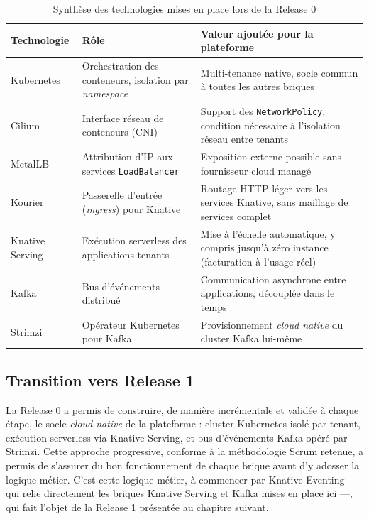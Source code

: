 \begin{table}[!ht]
\begin{center}
     \begin{tabular}{|l{2.8cm}|l{4.8cm}|l{5.4cm}|}
     \hline
     \textbf{Technologie} & \textbf{Rôle} & \textbf{Valeur ajoutée pour la plateforme} \\
     \hline
     Kubernetes & Orchestration des conteneurs, isolation par \textit{namespace} & Multi-tenance native, socle commun à toutes les autres briques \\
     \hline
     Cilium & Interface réseau de conteneurs (CNI) & Support des \texttt{NetworkPolicy}, condition nécessaire à l'isolation réseau entre tenants \\
     \hline
     MetalLB & Attribution d'IP aux services \texttt{LoadBalancer} & Exposition externe possible sans fournisseur cloud managé \\
     \hline
     Kourier & Passerelle d'entrée (\textit{ingress}) pour Knative & Routage HTTP léger vers les services Knative, sans maillage de services complet \\
     \hline
     Knative Serving & Exécution serverless des applications tenants & Mise à l'échelle automatique, y compris jusqu'à zéro instance (facturation à l'usage réel) \\
     \hline
     Kafka & Bus d'événements distribué & Communication asynchrone entre applications, découplée dans le temps \\
     \hline
     Strimzi & Opérateur Kubernetes pour Kafka & Provisionnement \textit{cloud native} du cluster Kafka lui-même \\
     \hline
     \end{tabular}
     \caption{Synthèse des technologies mises en place lors de la Release 0}
     \label{tab:synthese-release0}
     \end{center}
\end{table}

\subsection{Transition vers Release 1}

La Release 0 a permis de construire, de manière incrémentale et validée à chaque étape, le socle \textit{cloud native} de la plateforme : cluster Kubernetes isolé par tenant, exécution serverless via Knative Serving, et bus d'événements Kafka opéré par Strimzi. Cette approche progressive, conforme à la méthodologie Scrum retenue, a permis de s'assurer du bon fonctionnement de chaque brique avant d'y adosser la logique métier. C'est cette logique métier, à commencer par Knative Eventing — qui relie directement les briques Knative Serving et Kafka mises en place ici —, qui fait l'objet de la Release 1 présentée au chapitre suivant.
